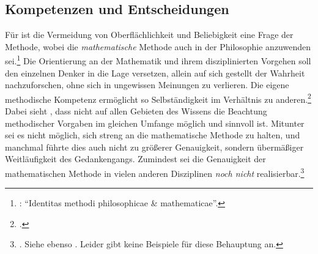 \subsection{Kompetenzen und Entscheidungen}\label{Abschnitt:WolffunddieWissenschaftlichkeitderPhilosophiemoregeometrico}
Für  ist die Vermeidung von Oberflächlichkeit und
Beliebigkeit eine Frage der Methode, wobei die \emph{mathematische} Methode auch
in der Philosophie anzuwenden
sei.\footnote{\cite[Vgl.][\S~139]{Wolff:Discursuspraeliminarisdephilosophiaingenere1996}:
\enquote{Identitas methodi philosophicae {\&} mathematicae}.} 
Die Orientierung an der Mathematik und ihrem disziplinierten Vorgehen soll den einzelnen Denker
in die Lage versetzen, allein auf sich gestellt der Wahrheit nachzuforschen,
ohne sich in ungewissen Meinungen zu verlieren. Die eigene methodische Kompetenz
ermöglicht so Selbständigkeit im Verhältnis zu
anderen.\footnote{\cite[Vgl.][\S\S~156--162]{Wolff:Discursuspraeliminarisdephilosophiaingenere1996}.}
Dabei sieht , dass nicht auf allen
Gebieten des Wissens die Beachtung methodischer Vorgaben im gleichen Umfange
möglich und sinnvoll ist. Mitunter sei es nicht möglich, sich streng
an die mathematische Methode zu halten, und manchmal führte dies auch nicht zu
größerer Genauigkeit, sondern übermäßiger Weitläufigkeit des Gedankengangs.
Zumindest sei die Genauigkeit der mathematischen Methode in vielen anderen
Disziplinen \emph{noch nicht} realisierbar.\footnote{\cite[Vgl.][Cap. 7,
\S~2]{Wolff:VernuenftigeGedankenvondenKraeftendesmenschlichenVerstandesundihremrichtigenGebraucheinErkenntnisderWahrheit1978}.
Siehe ebenso
\cite[][\S~148]{Wolff:Cogitationesrationalesdeviribusintellectushumani1983}.
Leider gibt 
keine Beispiele für diese Behauptung an.}


